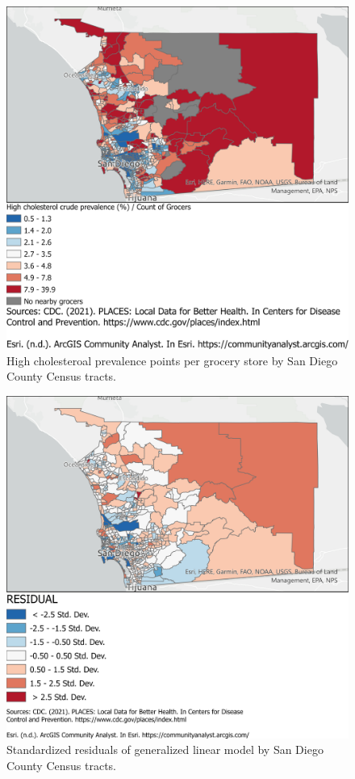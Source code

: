 \documentclass[]{elsarticle} %
\begin{document}
\begin{figure}
\centering
\includegraphics{"../map4.png"}
\caption{High cholesteroal prevalence points per grocery store by San
Diego County Census tracts.\label{fig4}}
\end{figure}

\begin{figure}
\centering
\includegraphics{"../map5.png"}
\caption{Standardized residuals of generalized linear model by San Diego
County Census tracts.\label{fig5}}
\end{figure}
\end{document}
